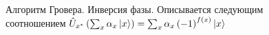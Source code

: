 \begin{figure}
\centering



\caption{Алгоритм Гровера. Инверсия фазы. Описывается следующим
  соотношением  $\hat{U}_{x^{\ast}}\left(\sum_x \alpha_x
  \ket{x}\right) =  
\sum_x \alpha_x \left(-1\right)^{f\left(x\right)}\ket{x}$}
\label{figQuantCompGroverInv}
\end{figure}
